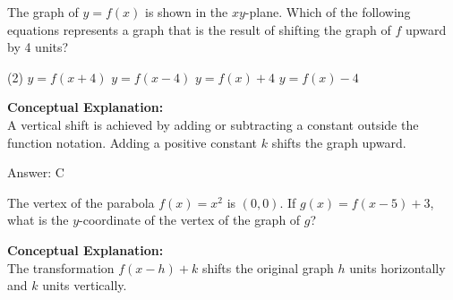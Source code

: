 \documentclass[11pt,paper=a4,answers]{exam}
\begin{document}
\begin{questions}
\pointsinrightmargin
\pointsdroppedatright
\marksnotpoints
{}
\pointformat{\boldmath\themarginpoints}
\bracketedpoints




\question
The graph of $y = f(x)$ is shown in the $xy$-plane. Which of the following equations represents a graph that is the result of shifting the graph of $f$ upward by 4 units?
\begin{tasks}(2)
    \task $y = f(x + 4)$
    \task $y = f(x - 4)$
    \task $y = f(x) + 4$
    \task $y = f(x) - 4$
\end{tasks}

\begin{solution}
\textbf{Conceptual Explanation:} \\
A vertical shift is achieved by adding or subtracting a constant outside the function notation. Adding a positive constant $k$ shifts the graph upward.

\vspace{25pt}

Answer: \colorbox{yellow!100}{C}
\end{solution}

\vspace{40pt}

\question
\begin{center}
\end{center}
The vertex of the parabola $f(x) = x^2$ is $(0, 0)$. If $g(x) = f(x-5) + 3$, what is the $y$-coordinate of the vertex of the graph of $g$?

\begin{solution}
\textbf{Conceptual Explanation:} \\
The transformation $f(x-h) + k$ shifts the original graph $h$ units horizontally and $k$ units vertically. 


\end{solution}
\end{questions}
\end{document}
